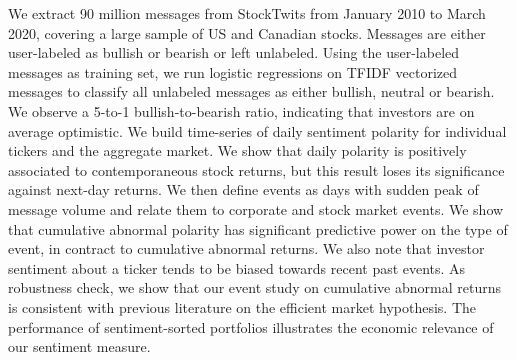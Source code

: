 We extract 90 million messages from StockTwits from January 2010 to March 2020, covering a large sample of US and Canadian stocks. Messages are either user-labeled as bullish or bearish or left unlabeled. Using the user-labeled messages as training set, we run logistic regressions on TFIDF vectorized messages to classify all unlabeled messages as either bullish, neutral or bearish. We observe a 5-to-1 bullish-to-bearish ratio, indicating that investors are on average optimistic. We build time-series of daily sentiment polarity for individual tickers and the aggregate market. We show that daily polarity is positively associated to contemporaneous stock returns, but this result loses its significance against next-day returns. We then define events as days with sudden peak of message volume and relate them to corporate and stock market events. We show that cumulative abnormal polarity has significant predictive power on the type of event, in contract to cumulative abnormal returns. We also note that investor sentiment about a ticker tends to be biased towards recent past events. As robustness check, we show that our event study on cumulative abnormal returns is consistent with previous literature on the efficient market hypothesis. The performance of sentiment-sorted portfolios illustrates the economic relevance of our sentiment measure.

